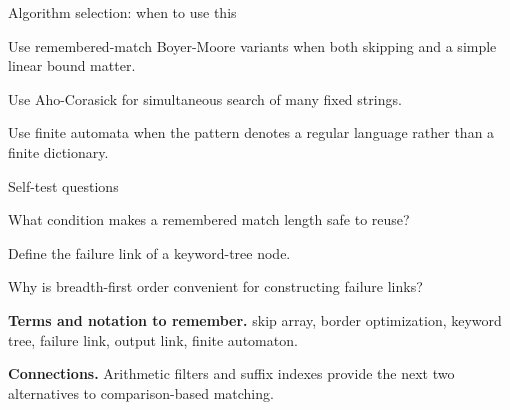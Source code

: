 \documentclass[11pt,letterpaper]{article}
\begin{document}
\begin{CornellOverviewBox}{Algorithm selection: when to use this}
\begin{CornellChecklist}
  \item Use remembered-match Boyer-Moore variants when both skipping and a simple linear bound matter.
  \item Use Aho-Corasick for simultaneous search of many fixed strings.
  \item Use finite automata when the pattern denotes a regular language rather than a finite dictionary.
\end{CornellChecklist}
\end{CornellOverviewBox}

\begin{CornellExamBox}{Self-test questions}
\begin{CornellRecallList}
  \item What condition makes a remembered match length safe to reuse?
  \item Define the failure link of a keyword-tree node.
  \item Why is breadth-first order convenient for constructing failure links?
\end{CornellRecallList}
\end{CornellExamBox}

{\footnotesize
\textbf{Terms and notation to remember.} skip array, border optimization, keyword tree, failure link, output link, finite automaton.

\textbf{Connections.} Arithmetic filters and suffix indexes provide the next two alternatives to comparison-based matching.
}
\end{document}
